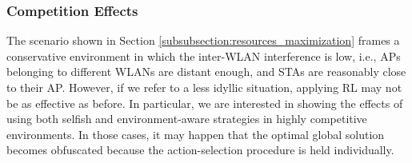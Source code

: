 \documentclass{article}
\begin{document}
\subsubsection{Competition Effects}
\label{subsubsection:competition}  

The scenario shown in Section \ref{subsubsection:resources_maximization} frames a conservative environment in which the inter-WLAN interference is low, i.e., APs belonging to different WLANs are distant enough, and STAs are reasonably close to their AP. However, if we refer to a less idyllic situation, applying RL may not be as effective as before. In particular, we are interested in showing the effects of using both selfish and environment-aware strategies in highly competitive environments. In those cases, it may happen that the optimal global solution becomes obfuscated because the action-selection procedure is held individually. 
\end{document}
